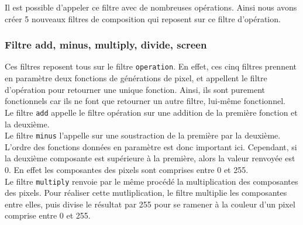 \documentclass[11pt]{article}
\begin{document}
Il est possible d'appeler ce filtre avec de nombreuses opérations. Ainsi nous avons créer 5 nouveaux filtres de composition qui reposent sur ce filtre d'opération.

\subsubsection{Filtre add, minus, multiply, divide, screen}

Ces filtres reposent tous sur le filtre \texttt{operation}. En effet, ces cinq filtres prennent en paramètre deux fonctions de générations de pixel, et appellent le filtre d'opération pour retourner une unique fonction. Ainsi, ils sont purement fonctionnels car ils ne font que retourner un autre filtre, lui-même fonctionnel. \\

Le filtre \texttt{add} appelle le filtre opération sur une addition de la première fonction et la deuxième. \\

Le filtre \texttt{minus} l'appelle sur une soustraction de la première par la deuxième. L'ordre des fonctions données en paramètre est donc important ici. Cependant, si la deuxième composante est supérieure à la première, alors la valeur renvoyée est 0. En effet les composantes des pixels sont comprises entre 0 et 255. \\

Le filtre \texttt{multiply} renvoie par le même procédé la multiplication des composantes des pixels. Pour réaliser cette mutliplication, le filtre multiplie les composantes entre elles, puis divise le résultat par 255 pour se ramener à la couleur d'un pixel comprise entre 0 et 255. \\
\end{document}
